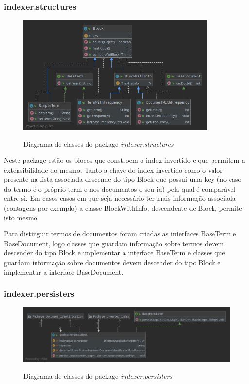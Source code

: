 \documentclass[12pt]{article}
\begin{document}
\subsubsection{indexer.structures}
\begin{figure}[h]
  \center
  \includegraphics[width=10cm]{packages_indexer_structures.png}
  \label{fig:packages_indexer_structures}
  \caption{Diagrama de classes do package \it indexer.structures}
\end{figure}

Neste package estão os blocos que constroem o index invertido e que permitem
a extensibilidade do mesmo. Tanto a chave do index invertido como o valor presente
na lista associada descende do tipo Block que possui uma key (no caso do termo é o
próprio term e nos documentos o seu id) pela qual é comparável entre si. Em casos
casos em que seja necessário ter mais informação associada (contagens por exemplo)
a classe BlockWithInfo, descendente de Block, permite isto mesmo.

Para distinguir termos de documentos foram criadas as interfaces BaseTerm e BaseDocument,
logo classes que guardam informação sobre termos devem descender do tipo Block e
implementar a interface BaseTerm e classes que guardam informação sobre documentos
devem descender do tipo Block e implementar a interface BaseDocument.

\subsubsection{indexer.persisters}
\begin{figure}[h]
  \center
  \includegraphics[width=16cm]{packages_indexer_persisters.png}
  \label{fig:packages_indexer_structures}
  \caption{Diagrama de classes do package \it indexer.persisters}
\end{figure}
\end{document}
